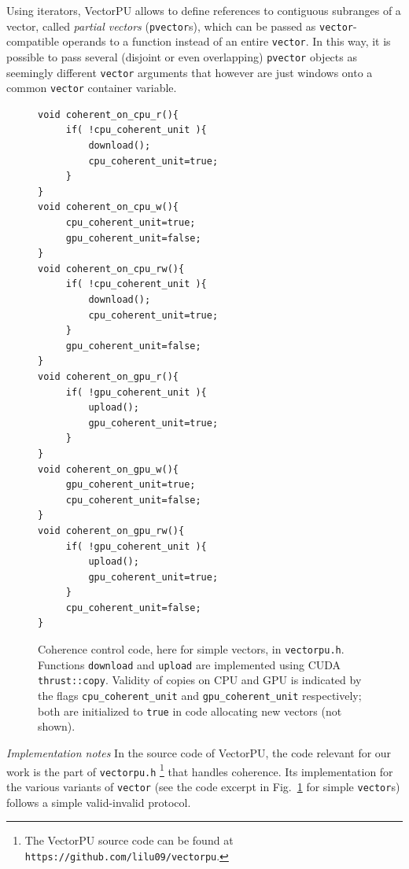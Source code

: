 Using iterators, VectorPU allows to define references to
contiguous subranges of a vector,
called \textit{partial vectors} (\texttt{pvector}s), 
which can be passed as \texttt{vector}-compatible
operands to a function instead of an entire \texttt{vector}.
In this way, it is possible to pass several (disjoint or even
overlapping) \texttt{pvector} objects as seemingly different \texttt{vector}
arguments that however are just windows onto
a common \texttt{vector} container variable. 

\begin{figure}
\begin{small}
\begin{verbatim}
void coherent_on_cpu_r(){
  	 if( !cpu_coherent_unit ){
  		 download();
  		 cpu_coherent_unit=true;
  	 }
}
void coherent_on_cpu_w(){
  	 cpu_coherent_unit=true;
  	 gpu_coherent_unit=false;
}
void coherent_on_cpu_rw(){
  	 if( !cpu_coherent_unit ){
  		 download();
  		 cpu_coherent_unit=true;
  	 }
  	 gpu_coherent_unit=false;
}
void coherent_on_gpu_r(){
  	 if( !gpu_coherent_unit ){
  		 upload();
  		 gpu_coherent_unit=true;
	 }
}
void coherent_on_gpu_w(){
  	 gpu_coherent_unit=true;
  	 cpu_coherent_unit=false;
}
void coherent_on_gpu_rw(){
  	 if( !gpu_coherent_unit ){
  		 upload();
  		 gpu_coherent_unit=true;
  	 }
  	 cpu_coherent_unit=false;
}
\end{verbatim}
\end{small}
\caption{\label{fig:vectorpucoherence}Coherence control code,
    here for simple vectors,
    in \texttt{vectorpu.h}. Functions \texttt{download} and
    \texttt{upload} are implemented using CUDA
    \texttt{thrust::copy}. Validity of copies on CPU and GPU
     is indicated
     by the flags \texttt{cpu\_coherent\_unit} and
     \texttt{gpu\_coherent\_unit} respectively; both are
     initialized to \texttt{true}
     in code allocating new vectors (not shown).}
\end{figure}

\vspace{1.4mm}
\noindent
\textit{Implementation notes }
In the source code of VectorPU, the code
relevant for our work is the part of \verb+vectorpu.h+%
\footnote{The VectorPU source code can be found at
\texttt{https://github.com/lilu09/vectorpu}.} 
that handles coherence. Its implementation for the various
variants of \texttt{vector} 
(see the code excerpt in Fig.~\ref{fig:vectorpucoherence} for
simple \texttt{vector}s) follows a
simple valid-invalid protocol.

